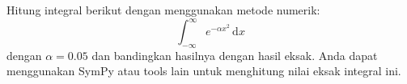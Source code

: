\documentclass[12pt]{article}
\begin{document}
\thispagestyle{empty}

Hitung integral berikut dengan menggunakan metode numerik:
$$
\int_{-\infty}^{\infty} e^{-\alpha x^2}\,\mathrm{d}x
$$
dengan $\alpha = 0.05$
dan bandingkan hasilnya dengan hasil eksak. Anda dapat menggunakan SymPy
atau tools lain untuk menghitung nilai eksak integral ini.
\end{document}
